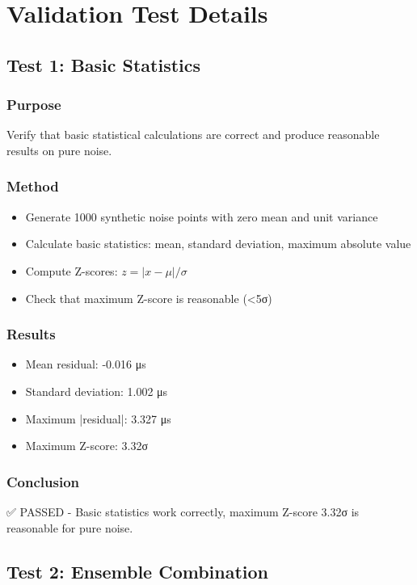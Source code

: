 \section{Validation Test Details}

\subsection{Test 1: Basic Statistics}

\subsubsection{Purpose}
Verify that basic statistical calculations are correct and produce reasonable results on pure noise.

\subsubsection{Method}
\begin{itemize}
    \item Generate 1000 synthetic noise points with zero mean and unit variance
    \item Calculate basic statistics: mean, standard deviation, maximum absolute value
    \item Compute Z-scores: $z = |x - \mu| / \sigma$
    \item Check that maximum Z-score is reasonable (<5σ)
\end{itemize}

\subsubsection{Results}
\begin{itemize}
    \item Mean residual: -0.016 μs
    \item Standard deviation: 1.002 μs
    \item Maximum |residual|: 3.327 μs
    \item Maximum Z-score: 3.32σ
\end{itemize}

\subsubsection{Conclusion}
✅ PASSED - Basic statistics work correctly, maximum Z-score 3.32σ is reasonable for pure noise.

\subsection{Test 2: Ensemble Combination}


